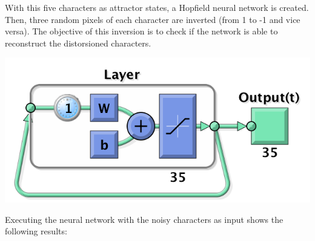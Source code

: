 \documentclass[10pt]{article}
\begin{document}
\begin{multicols}{2}
  With this five characters as attractor states, a Hopfield neural
  network is created. Then, three random pixels of each character
  are inverted (from 1 to -1 and vice versa). The objective of this
  inversion is to check if the network is able to reconstruct the
  distorsioned characters.

  \begin{center}
    \includegraphics[width=0.7\linewidth]{img/net}
  \end{center}

  Executing the neural network with the noisy characters as input
  shows the following results:


\end{multicols}
\end{document}
